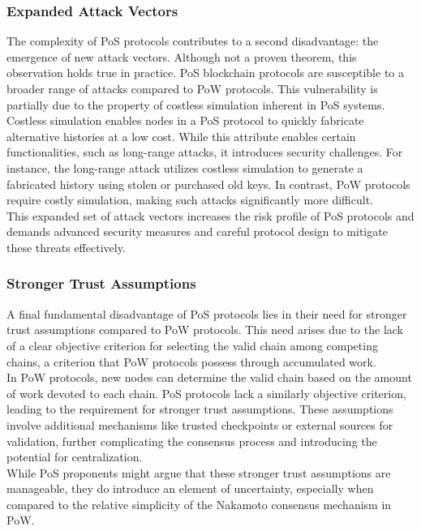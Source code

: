 \subsubsection{Expanded Attack Vectors}
The complexity of PoS protocols contributes to a second disadvantage: the emergence of new attack vectors. Although not a proven theorem, this observation holds true in practice. PoS blockchain protocols are susceptible to a broader range of attacks compared to PoW protocols. This vulnerability is partially due to the property of costless simulation inherent in PoS systems.\\
Costless simulation enables nodes in a PoS protocol to quickly fabricate alternative histories at a low cost. While this attribute enables certain functionalities, such as long-range attacks, it introduces security challenges. For instance, the long-range attack utilizes costless simulation to generate a fabricated history using stolen or purchased old keys. In contrast, PoW protocols require costly simulation, making such attacks significantly more difficult.\\
This expanded set of attack vectors increases the risk profile of PoS protocols and demands advanced security measures and careful protocol design to mitigate these threats effectively.

\subsubsection{Stronger Trust Assumptions}
A final fundamental disadvantage of PoS protocols lies in their need for stronger trust assumptions compared to PoW protocols. This need arises due to the lack of a clear objective criterion for selecting the valid chain among competing chains, a criterion that PoW protocols possess through accumulated work.\\
In PoW protocols, new nodes can determine the valid chain based on the amount of work devoted to each chain. PoS protocols lack a similarly objective criterion, leading to the requirement for stronger trust assumptions. These assumptions involve additional mechanisms like trusted checkpoints or external sources for validation, further complicating the consensus process and introducing the potential for centralization.\\
While PoS proponents might argue that these stronger trust assumptions are manageable, they do introduce an element of uncertainty, especially when compared to the relative simplicity of the Nakamoto consensus mechanism in PoW.

